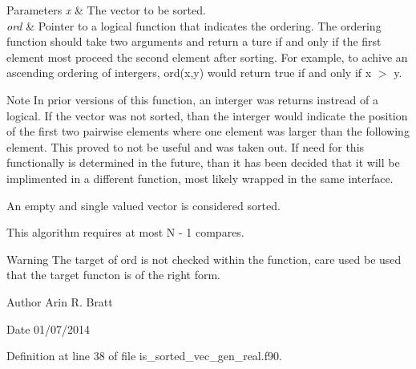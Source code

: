 \begin{DoxyParams}{Parameters}
{\em x} & The vector to be sorted.\\
\hline
{\em ord} & Pointer to a logical function that indicates the ordering. The ordering function should take two arguments and return a ture if and only if the first element most proceed the second element after sorting. For example, to achive an ascending ordering of intergers, ord(x,y) would return true if and only if x $>$ y.\\
\hline
\end{DoxyParams}
\begin{DoxyNote}{Note}
In prior versions of this function, an interger was returns instread of a logical. If the vector was not sorted, than the interger would indicate the position of the first two pairwise elements where one element was larger than the following element. This proved to not be useful and was taken out. If need for this functionally is determined in the future, than it has been decided that it will be implimented in a different function, most likely wrapped in the same interface.

An empty and single valued vector is considered sorted.

This algorithm requires at most N -\/ 1 compares.
\end{DoxyNote}
\begin{DoxyWarning}{Warning}
The target of ord is not checked within the function, care used be used that the target functon is of the right form.
\end{DoxyWarning}
\begin{DoxyAuthor}{Author}
Arin R. Bratt 
\end{DoxyAuthor}
\begin{DoxyDate}{Date}
01/07/2014 
\end{DoxyDate}


Definition at line 38 of file is\-\_\-sorted\-\_\-vec\-\_\-gen\-\_\-real.\-f90.

